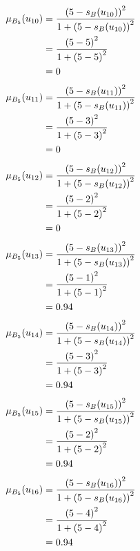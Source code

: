 \documentclass[a4paper]{book}
\begin{document}
				\begin{align}
					\mu_{B_5}(u_{10}) &= \frac{\left(5-s_B(u_{10})\right)^2}{1 + \left(5-s_B(u_{10})\right)^2}\\
					&= \frac{\left(5-5\right)^2}{1 + \left(5-5\right)^2} \notag \\
					&= 0 \notag
				\end{align}
				\begin{align}
					\mu_{B_5}(u_{11}) &= \frac{\left(5-s_B(u_{11})\right)^2}{1 + \left(5-s_B(u_{11})\right)^2}\\
					&= \frac{\left(5-3\right)^2}{1 + \left(5-3\right)^2} \notag \\
					&= 0 \notag
				\end{align}
				\begin{align}
					\mu_{B_5}(u_{12}) &= \frac{\left(5-s_B(u_{12})\right)^2}{1 + \left(5-s_B(u_{12})\right)^2}\\
					&= \frac{\left(5-2\right)^2}{1 + \left(5-2\right)^2} \notag \\
					&= 0 \notag
				\end{align}
				\begin{align}
					\mu_{B_5}(u_{13}) &= \frac{\left(5-s_B(u_{13})\right)^2}{1 + \left(5-s_B(u_{13})\right)^2}\\
					&= \frac{\left(5-1\right)^2}{1 + \left(5-1\right)^2} \notag \\
					&= 0.94 \notag
				\end{align}
				\begin{align}
					\mu_{B_5}(u_{14}) &= \frac{\left(5-s_B(u_{14})\right)^2}{1 + \left(5-s_B(u_{14})\right)^2}\\
					&= \frac{\left(5-3\right)^2}{1 + \left(5-3\right)^2} \notag \\
					&= 0.94 \notag
				\end{align}
				\begin{align}
					\mu_{B_5}(u_{15}) &= \frac{\left(5-s_B(u_{15})\right)^2}{1 + \left(5-s_B(u_{15})\right)^2}\\
					&= \frac{\left(5-2\right)^2}{1 + \left(5-2\right)^2} \notag \\
					&= 0.94 \notag
				\end{align}
				\begin{align}
					\mu_{B_5}(u_{16}) &= \frac{\left(5-s_B(u_{16})\right)^2}{1 + \left(5-s_B(u_{16})\right)^2}\\
					&= \frac{\left(5-4\right)^2}{1 + \left(5-4\right)^2} \notag \\
					&= 0.94 \notag
				\end{align}
\end{document}
